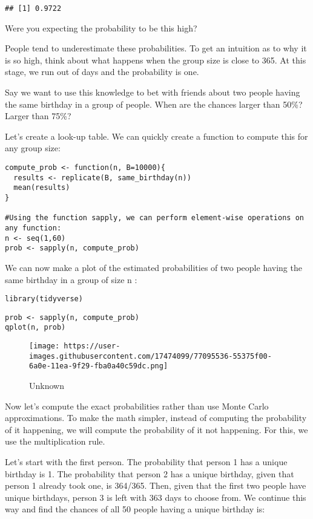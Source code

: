 \documentclass[
]{article}
\begin{document}
\begin{verbatim}
## [1] 0.9722
\end{verbatim}

Were you expecting the probability to be this high?

People tend to underestimate these probabilities. To get an intuition as
to why it is so high, think about what happens when the group size is
close to 365. At this stage, we run out of days and the probability is
one.

Say we want to use this knowledge to bet with friends about two people
having the same birthday in a group of people. When are the chances
larger than 50\%? Larger than 75\%?

Let's create a look-up table. We can quickly create a function to
compute this for any group size:

\begin{verbatim}
compute_prob <- function(n, B=10000){
  results <- replicate(B, same_birthday(n))
  mean(results)
}

#Using the function sapply, we can perform element-wise operations on any function:
n <- seq(1,60)
prob <- sapply(n, compute_prob)
\end{verbatim}

We can now make a plot of the estimated probabilities of two people
having the same birthday in a group of size n :

\begin{verbatim}
library(tidyverse)
\end{verbatim}

\begin{verbatim}
prob <- sapply(n, compute_prob)
qplot(n, prob)
\end{verbatim}

\begin{figure}
\centering
\texttt{[image: https://user-images.githubusercontent.com/17474099/77095536-55375f00-6a0e-11ea-9f29-fba0a40c59dc.png]}
\caption{Unknown}
\end{figure}

Now let's compute the exact probabilities rather than use Monte Carlo
approximations. To make the math simpler, instead of computing the
probability of it happening, we will compute the probability of it not
happening. For this, we use the multiplication rule.

Let's start with the first person. The probability that person 1 has a
unique birthday is 1. The probability that person 2 has a unique
birthday, given that person 1 already took one, is 364/365. Then, given
that the first two people have unique birthdays, person 3 is left with
363 days to choose from. We continue this way and find the chances of
all 50 people having a unique birthday is:
\end{document}
